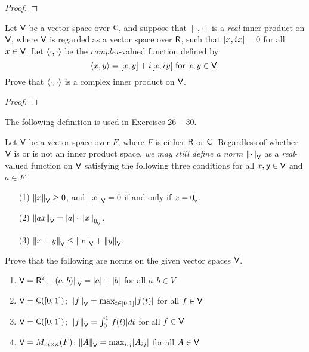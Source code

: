 \begin{proof}
\end{proof}

\begin{exercise} \label{exercise 6.1.25}
Let \(\textsf{V}\) be a vector space over \(\textsf{C}\), and suppose that \([ \cdot, \cdot ]\) is a \emph{real} inner product on \(\textsf{V}\), where \(\textsf{V}\) is regarded as a vector space over \(\textsf{R}\), such that \([x, {i\mkern1mu} x] = 0\) for all \(x \in \textsf{V}\).
Let \(\left< \cdot, \cdot \right>\) be the \emph{complex}-valued function defined by
\[
    \left< x, y \right> = [x, y] + {i\mkern1mu}[x, {i\mkern1mu} y] \text{ for } x, y \in \textsf{V}.
\]
Prove that \(\left< \cdot, \cdot \right>\) is a complex inner product on \(\textsf{V}\).
\end{exercise}

\begin{proof}
\end{proof}

The following definition is used in Exercises 26 -- 30.

\begin{additional definition} \label{adef 6.2}
Let \(\textsf{V}\) be a vector space over \(F\), where \(F\) is either \(\textsf{R}\) or \(\textsf{C}\).
Regardless of whether \(\textsf{V}\) is or is not an inner product space, \emph{we may still define a norm} \(\left\lVert \cdot \right\rVert_{\textsf{V}}\) as a \emph{real}-valued function on \(\textsf{V}\) satisfying the following three conditions for all \(x, y \in \textsf{V}\) and \(a \in F\):
\begin{enumerate}
\item[(1)] \(\left\lVert x\right\rVert_{\textsf{V}} \ge 0\), and \(\left\lVert x\right\rVert_{\textsf{V}} = 0\) if and only if \(x = 0_{_{\textsf{V}}}\).
\item[(2)] \(\left\lVert ax\right\rVert_{\textsf{V}} = \lvert a\rvert \cdot \left\lVert x\right\rVert_{0_{_{\textsf{V}}}}\).
\item[(3)] \(\left\lVert x + y\right\rVert_{\textsf{V}} \le \left\lVert x\right\rVert_{\textsf{V}} + \left\lVert y\right\rVert_{\textsf{V}}\).
\end{enumerate}
\end{additional definition}

\begin{exercise} \label{exercise 6.1.26}
Prove that the following are norms on the given vector spaces \(\textsf{V}\).
\begin{enumerate}
\item \(\textsf{V} = \textsf{R}^2\); \quad \(\left\lVert(a, b)\right\rVert_{\textsf{V}} = \lvert a\rvert + \lvert b\rvert\) for all \(a, b \in V\)
\item \(\textsf{V} = \textsf{C}([0, 1])\); \quad \(\left\lVert f\right\rVert_{\textsf{V}} = \max_{t \in [0, 1]} \lvert f(t)\rvert\) for all \(f \in \textsf{V}\)
\item \(\textsf{V} = \textsf{C}([0, 1])\); \(\left\lVert f\right\rVert_{\textsf{V}} = \int_0^1 \lvert f(t)\rvert dt\) for all \(f \in \textsf{V}\)
\item \(\textsf{V} = M_{m \times n}(F)\); \(\left\lVert A\right\rVert_{\textsf{V}} = \max_{i, j} \lvert A_{ij}\rvert\) for all \(A \in \textsf{V}\)
\end{enumerate}
\end{exercise}

